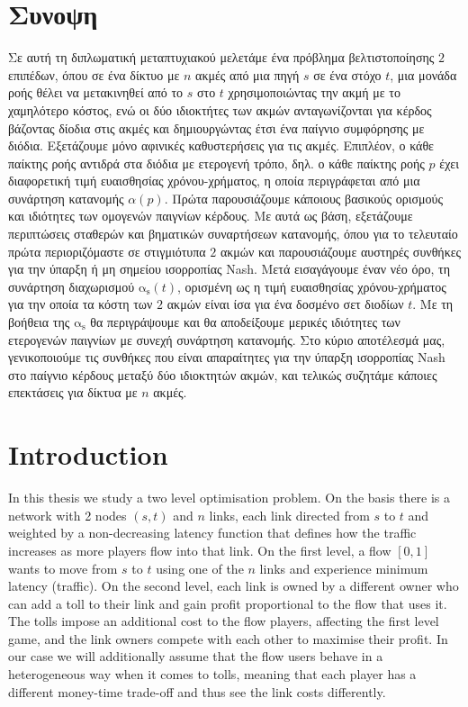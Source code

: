 \documentclass[10pt,a4paper]{book}
\newcommand{\as}{\mathrm{\alpha_s}}
\theoremstyle{definition}
\theoremstyle{comment}
\begin{document}
\chapter*{Συνοψη}
Σε αυτή τη διπλωματική μεταπτυχιακού μελετάμε ένα πρόβλημα βελτιστοποίησης $2$ επιπέδων, όπου σε ένα δίκτυο με $n$ ακμές από μια πηγή $s$ σε ένα στόχο $t$, μια μονάδα ροής θέλει να μετακινηθεί από το $s$ στο $t$ χρησιμοποιώντας την ακμή με το χαμηλότερο κόστος, ενώ οι δύο ιδιοκτήτες των ακμών ανταγωνίζονται για κέρδος βάζοντας δίοδια στις ακμές και δημιουργώντας έτσι ένα παίγνιο συμφόρησης με διόδια.
Εξετάζουμε μόνο αφινικές καθυστερήσεις για τις ακμές.
Επιπλέον, ο κάθε παίκτης ροής αντιδρά στα διόδια με ετερογενή τρόπο, δηλ. ο κάθε παίκτης ροής $p$ έχει διαφορετική τιμή ευαισθησίας χρόνου-χρήματος, η οποία περιγράφεται από μια συνάρτηση κατανομής $\alpha(p)$.
Πρώτα παρουσιάζουμε κάποιους βασικούς ορισμούς και ιδιότητες των ομογενών παιγνίων κέρδους.
Mε αυτά ως βάση, εξετάζουμε περιπτώσεις σταθερών και βηματικών συναρτήσεων κατανομής, όπου για το τελευταίο πρώτα περιοριζόμαστε σε στιγμιότυπα $2$ ακμών και παρουσιάζουμε αυστηρές συνθήκες για την ύπαρξη ή μη σημείου ισορροπίας Nash.
Μετά εισαγάγουμε έναν νέο όρο, τη συνάρτηση διαχωρισμού $\as(t)$, ορισμένη ως η τιμή ευαισθησίας χρόνου-χρήματος για την οποία τα κόστη των $2$ ακμών είναι ίσα για ένα δοσμένο σετ διοδίων $t$.
Με τη βοήθεια της $\as$ θα περιγράψουμε και θα αποδείξουμε μερικές ιδιότητες των ετερογενών παιγνίων με συνεχή συνάρτηση κατανομής.
Στο κύριο αποτέλεσμά μας, γενικοποιούμε τις συνθήκες που είναι απαραίτητες για την ύπαρξη ισορροπίας Nash στο παίγνιο κέρδους μεταξύ δύο ιδιοκτητών ακμών, και τελικώς συζητάμε κάποιες επεκτάσεις για δίκτυα με $n$ ακμές.
\clearpage

\thispagestyle{empty}
\null
\clearpage

\pagestyle{fancy}

\tableofcontents
\clearpage

\thispagestyle{empty}
\null
\clearpage



\chapter{Introduction}
\label{chapter:intro}

In this thesis we study a two level optimisation problem.
On the basis there is a network with 2 nodes $(s, t)$ and $n$ links, each link directed from $s$ to $t$ and weighted by a non-decreasing latency function that defines how the traffic increases as more players flow into that link.
On the first level, a flow $[0, 1]$ wants to move from $s$ to $t$ using one of the $n$ links and experience minimum latency (traffic).
On the second level, each link is owned by a different owner who can add a toll to their link and gain profit proportional to the flow that uses it.
The tolls impose an additional cost to the flow players, affecting the first level game, and the link owners compete with each other to maximise their profit.
In our case we will additionally assume that the flow users behave in a heterogeneous way when it comes to tolls, meaning that each player has a different money-time trade-off and thus see the link costs differently.
\end{document}
